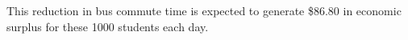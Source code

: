 \documentclass[11pt,letterpaper]{article}\usepackage[]{graphicx}\usepackage[]{color}
\begin{document}
\begin{enumerate}[label=\alph*., leftmargin=*]
\begin{enumerate}[label=\roman*.]
		This reduction in bus commute time is expected to generate \$86.80 in economic surplus for these 1000 students each day.
	\end{enumerate}

\end{enumerate}
\end{document}
